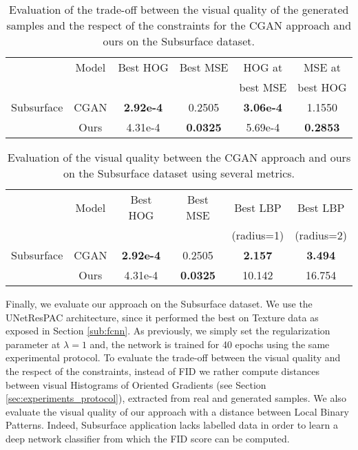 \begin{table}
	\centering
	\begin{tabular}{|l|c|c|c|c|c|}
		\hline
		&Model           & Best HOG & Best MSE& HOG at & MSE at \\
		&&& &  best MSE & best HOG \\
		\hline
		Subsurface &CGAN   & \textbf{2.92e-4} & 0.2505 & \textbf{3.06e-4}  & 1.1550 \\
		&Ours            & 4.31e-4 & \textbf{0.0325}& 5.69e-4 & \textbf{0.2853} \\
		\hline
	\end{tabular}
	\caption{Evaluation of the trade-off between the visual quality of the generated samples and the respect of the constraints for the CGAN approach and ours on the Subsurface dataset.}
	\label{tab:subsurface}
\end{table}

\begin{table}[h]
	\centering
	\begin{tabular}{|l|c|c|c|c|c|}
		\hline
		&Model           & Best HOG & Best MSE& Best LBP & Best LBP \\
		&&& & (radius=1) & (radius=2) \\
		\hline
		Subsurface &CGAN   & \textbf{2.92e-4} & 0.2505 & \textbf{2.157} & \textbf{3.494}\\
		&Ours            &  4.31e-4 &\textbf{0.0325} & 10.142 & 16.754 \\
		\hline
	\end{tabular}
	\caption{Evaluation of the visual quality between the CGAN approach and ours on the Subsurface dataset using several metrics.}
	\label{tab:subsurface_visual}
\end{table}

Finally, we evaluate our approach on the Subsurface dataset. We use the UNetResPAC  architecture, since it performed the best on Texture data as exposed in Section \ref{sub:fcnn}. As previously, we simply set the regularization parameter at $\lambda=1$ and, the network is trained for 40 epochs using the same experimental protocol. To evaluate the trade-off between the visual quality and the respect of the constraints, instead of FID we rather compute distances between visual Histograms of Oriented Gradients (see Section \ref{sec:experiments_protocol}), extracted from real and generated samples. We also evaluate the visual quality of our approach with a distance between Local Binary Patterns. Indeed, Subsurface application lacks labelled data in order to learn a deep network classifier from which the FID score can be computed. 

